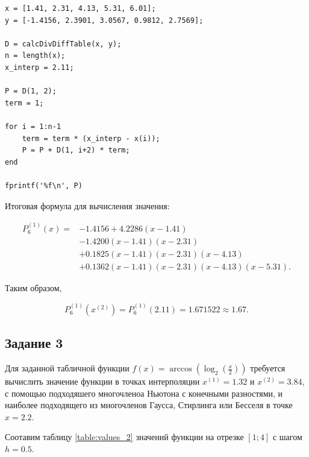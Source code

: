 \begin{listing}[H]
\caption{Вычисление значения функции в точке $x^{(2)} = 2.11$ с помощью многочлена Ньютона первого вида}
\vspace{-20pt}
\label{lst:task2_2}
\begin{verbatim}
x = [1.41, 2.31, 4.13, 5.31, 6.01];
y = [-1.4156, 2.3901, 3.0567, 0.9812, 2.7569];

D = calcDivDiffTable(x, y);
n = length(x);
x_interp = 2.11;

P = D(1, 2);
term = 1;

for i = 1:n-1
    term = term * (x_interp - x(i));
    P = P + D(1, i+2) * term;
end

fprintf('%f\n', P)
\end{verbatim}
\end{listing}

Итоговая формула для вычисления значения:

\[
\begin{aligned}
P_6^{(1)}(x)={}&
-1.4156
+4.2286(x-1.41)\\
&-1.4200(x-1.41)(x-2.31)\\
&+0.1825(x-1.41)(x-2.31)(x-4.13)\\
&+0.1362(x-1.41)(x-2.31)(x-4.13)(x-5.31).
\end{aligned}
\]

Таким образом,

\[
P_6^{(1)}(x^{(2)}) = P_6^{(1)}(2.11) = 1.671522 \approx 1.67.
\]

\subsection{Задание 3}

Для заданной табличной функции $f(x) = \arccos(\log_2(\frac{x}{2}))$ требуется вычислить значение функции в точках интерполяции $x^{(1)}= 1.32$ и $x^{(2)}= 3.84$, с помощью подходяшего многочленоа Ньютона с конечными разностями, и наиболее подходящего
из многочленов Гаусса, Стирлинга или Бесселя в точке $x = 2.2$.

Соотавим таблицу \ref{table:values_2} значений функции на отрезке $[1;4]$ с шагом $h = 0.5$.


\begin{table}[H]
    \centering
    \caption{Значения функции $f$ на отрезке $[1;4]$ с шагом $h = 0.5$}
    \label{table:values_2}
\end{table}

